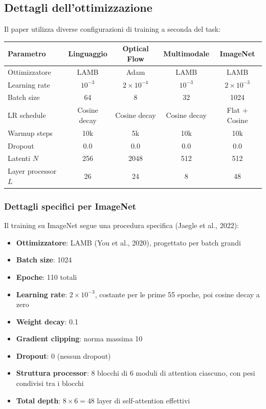 \documentclass[12pt,a4paper]{article}
\begin{document}
\subsection{Dettagli dell'ottimizzazione}

Il paper utilizza diverse configurazioni di training a seconda del task:

\begin{center}
\begin{tabular}{lcccc}
\toprule
\textbf{Parametro} & \textbf{Linguaggio} & \textbf{Optical Flow} & \textbf{Multimodale} & \textbf{ImageNet} \\
\midrule
Ottimizzatore & LAMB & Adam & LAMB & LAMB \\
Learning rate & $10^{-3}$ & $2 \times 10^{-4}$ & $10^{-3}$ & $2 \times 10^{-3}$ \\
Batch size & 64 & 8 & 32 & 1024 \\
LR schedule & Cosine decay & Cosine decay & Cosine decay & Flat + Cosine \\
Warmup steps & 10k & 5k & 10k & 10k \\
Dropout & 0.0 & 0.0 & 0.0 & 0.0 \\
Latenti $N$ & 256 & 2048 & 512 & 512 \\
Layer processor $L$ & 26 & 24 & 8 & 48 \\
\bottomrule
\end{tabular}
\end{center}

\subsubsection{Dettagli specifici per ImageNet}

Il training su ImageNet segue una procedura specifica (Jaegle et al., 2022):
\begin{itemize}
    \item \textbf{Ottimizzatore}: LAMB (You et al., 2020), progettato per batch grandi
    \item \textbf{Batch size}: 1024
    \item \textbf{Epoche}: 110 totali
    \item \textbf{Learning rate}: $2 \times 10^{-3}$, costante per le prime 55 epoche, poi cosine decay a zero
    \item \textbf{Weight decay}: 0.1
    \item \textbf{Gradient clipping}: norma massima 10
    \item \textbf{Dropout}: 0 (nessun dropout)
    \item \textbf{Struttura processor}: 8 blocchi di 6 moduli di attention ciascuno, con pesi condivisi tra i blocchi
    \item \textbf{Total depth}: $8 \times 6 = 48$ layer di self-attention effettivi
\end{itemize}
\end{document}
